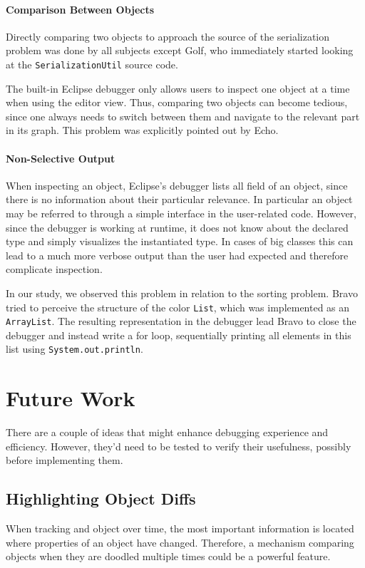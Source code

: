 \documentclass[english]{scrartcl}
\newcommand{\println}{\texttt{Sys\-tem.\-out.\-println}\xspace}
\begin{document}
\paragraph{Comparison Between Objects}
Directly comparing two objects to approach the source of the serialization problem was done by all subjects except Golf, who immediately started looking at the \texttt{SerializationUtil} source code.

The built-in Eclipse debugger only allows users to inspect one object at a time when using the editor view.
Thus, comparing two objects can become tedious, since one always needs to switch between them and navigate to the relevant part in its graph.
This problem was explicitly pointed out by Echo.

\paragraph{Non-Selective Output}
When inspecting an object, Eclipse's debugger lists all field of an object, since there is no information about their particular relevance.
In particular an object may be referred to through a simple interface in the user-related code.
However, since the debugger is working at runtime, it does not know about the declared type and simply visualizes the instantiated type.
In cases of big classes this can lead to a much more verbose output than the user had expected and therefore complicate inspection.

In our study, we observed this problem in relation to the sorting problem.
Bravo tried to perceive the structure of the color \texttt{List}, which was implemented as an \texttt{ArrayList}.
The resulting representation in the debugger lead Bravo to close the debugger and instead write a for loop, sequentially printing all elements in this list using \println.

\section{Future Work}
There are a couple of ideas that might enhance debugging experience and efficiency.
However, they'd need to be tested to verify their usefulness, possibly before implementing them.

\subsection{Highlighting Object Diffs}
When tracking and object over time, the most important information is located where properties of an object have changed.
Therefore, a mechanism comparing objects when they are doodled multiple times could be a powerful feature.
\end{document}

